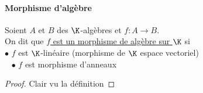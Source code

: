 		\paragraph{Morphisme d'algèbre}
			Soient $A$ et $B$ des $\K$-algèbres et $f: A\to B$. \\ On dit que \uline{$f$ est un morphisme de algèbre sur $\K$} si\\
			\hspace*{2cm} $\bullet$ $f$ est $\K$-linéaire {\tiny (morphisme de $\K$ espace vectoriel)} \\\ \hspace*{2cm} $\bullet$ $f$ est morphisme d'anneaux \trait
		\begin{proof}
		Clair vu la définition
		\end{proof} ${}$ \\ 
		\begin{center}
		\fin
        \end{center}